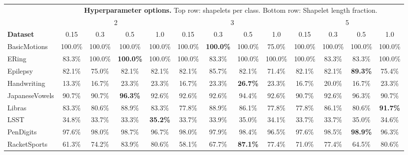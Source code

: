 \begin{tabular}{lcccccccccccc}
\toprule
& \multicolumn{12}{c}{\textbf{Hyperparameter options.} Top row: shapelets per class. Bottom row: Shapelet length fraction.}\\
{}                        & \multicolumn{4}{c}{{2}}    & \multicolumn{4}{c}{{3}}    & \multicolumn{4}{c}{{5}}  \\ \cmidrule(lr){2-5} \cmidrule(lr){6-9} \cmidrule(lr){10-13}
\textbf{Dataset}          & 0.15   & 0.3    & 0.5    & 1.0    & 0.15   & 0.3    & 0.5    & 1.0    & 0.15   & 0.3    & 0.5    & 1.0 \\
\midrule
BasicMotions              &                100.0\% &     100.0\% &     100.0\% &     100.0\% &      100.0\% &     \textbf{100.0\%} &     100.0\% &      75.0\% &      100.0\% &     100.0\% &     100.0\% &     100.0\% \\
ERing                     &                 83.3\% &     100.0\% &     \textbf{100.0\%} &     100.0\% &      100.0\% &      83.3\% &     100.0\% &     100.0\% &      100.0\% &      83.3\% &      83.3\% &     100.0\% \\
Epilepsy                  &                 82.1\% &      75.0\% &      82.1\% &      82.1\% &       82.1\% &      85.7\% &      82.1\% &      71.4\% &       82.1\% &      82.1\% &      \textbf{89.3\%} &      75.4\% \\
Handwriting               &                 13.3\% &      16.7\% &      23.3\% &      23.3\% &       16.7\% &      23.3\% &      \textbf{26.7\%} &      23.3\% &       16.7\% &      20.0\% &      16.7\% &      23.3\% \\
JapaneseVowels            &                 90.7\% &      90.7\% &      \textbf{96.3\%} &      92.6\% &       92.6\% &      92.6\% &      94.4\% &      92.6\% &       90.7\% &      92.6\% &      96.3\% &      90.7\% \\
Libras                    &                 83.3\% &      80.6\% &      88.9\% &      83.3\% &       77.8\% &      88.9\% &      86.1\% &      77.8\% &       77.8\% &      86.1\% &      80.6\% &      \textbf{91.7\%} \\
LSST                      &                 34.8\% &      33.7\% &      33.3\% &      \textbf{35.2\%} &       33.7\% &      33.9\% &      35.0\% &      34.1\% &       33.7\% &      33.7\% &      35.0\% &      34.6\% \\
PenDigits                 &                 97.6\% &      98.0\% &      98.7\% &      96.7\% &       98.0\% &      97.9\% &      98.4\% &      96.5\% &       97.6\% &      98.5\% &      \textbf{98.9\%} &      96.3\% \\
RacketSports              &                 61.3\% &      74.2\% &      83.9\% &      80.6\% &       58.1\% &      67.7\% &      \textbf{87.1\%} &      77.4\% &       71.0\% &      77.4\% &      64.5\% &      80.6\% \\
\bottomrule
\end{tabular}
